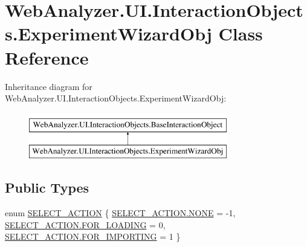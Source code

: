 \hypertarget{class_web_analyzer_1_1_u_i_1_1_interaction_objects_1_1_experiment_wizard_obj}{}\section{Web\+Analyzer.\+U\+I.\+Interaction\+Objects.\+Experiment\+Wizard\+Obj Class Reference}
\label{class_web_analyzer_1_1_u_i_1_1_interaction_objects_1_1_experiment_wizard_obj}
Inheritance diagram for Web\+Analyzer.\+U\+I.\+Interaction\+Objects.\+Experiment\+Wizard\+Obj\+:\begin{figure}[H]
\begin{center}
\leavevmode
\includegraphics[height=2.000000cm]{class_web_analyzer_1_1_u_i_1_1_interaction_objects_1_1_experiment_wizard_obj}
\end{center}
\end{figure}
\subsection*{Public Types}
\begin{DoxyCompactItemize}
\item 
enum \hyperlink{class_web_analyzer_1_1_u_i_1_1_interaction_objects_1_1_experiment_wizard_obj_a8d68b0ff79197613c58d75f6323bb6ba}{S\+E\+L\+E\+C\+T\+\_\+\+A\+C\+T\+I\+O\+N} \{ \hyperlink{class_web_analyzer_1_1_u_i_1_1_interaction_objects_1_1_experiment_wizard_obj_a8d68b0ff79197613c58d75f6323bb6baab50339a10e1de285ac99d4c3990b8693}{S\+E\+L\+E\+C\+T\+\_\+\+A\+C\+T\+I\+O\+N.\+N\+O\+N\+E} = -\/1, 
\hyperlink{class_web_analyzer_1_1_u_i_1_1_interaction_objects_1_1_experiment_wizard_obj_a8d68b0ff79197613c58d75f6323bb6baa047c0adfe72f2a351a143b7b46b0519b}{S\+E\+L\+E\+C\+T\+\_\+\+A\+C\+T\+I\+O\+N.\+F\+O\+R\+\_\+\+L\+O\+A\+D\+I\+N\+G} = 0, 
\hyperlink{class_web_analyzer_1_1_u_i_1_1_interaction_objects_1_1_experiment_wizard_obj_a8d68b0ff79197613c58d75f6323bb6baa05c8a6868499ead96ace0a258e3fb238}{S\+E\+L\+E\+C\+T\+\_\+\+A\+C\+T\+I\+O\+N.\+F\+O\+R\+\_\+\+I\+M\+P\+O\+R\+T\+I\+N\+G} = 1
 \}
\end{DoxyCompactItemize}
